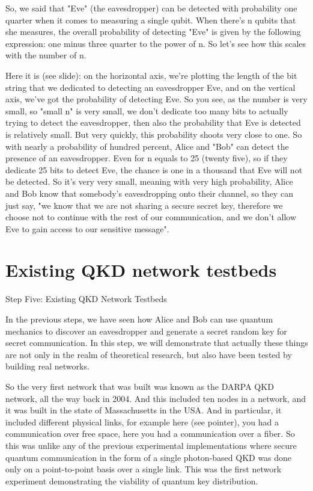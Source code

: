 So, we said that "Eve" (the eavesdropper) can be detected with probability one quarter when it comes to measuring a single qubit. When there's n qubits that she measures, the overall probability of detecting "Eve" is given by the following expression: one minus three quarter to the power of n. So let's see how this scales with the number of n.

Here it is (see slide): on the horizontal axis, we're plotting the length of the bit string that we dedicated to detecting an eavesdropper Eve, and on the vertical axis, we've got the probability of detecting Eve. So you see, as the number is very small, so "small n" is very small, we don't dedicate too many bits to actually trying to detect the eavesdropper, then also the probability that Eve is detected is relatively small. But very quickly, this probability shoots very close to one. So with nearly a probability of hundred percent, Alice and "Bob" can detect the presence of an eavesdropper. Even for n equals to 25 (twenty five), so if they dedicate 25 bits to detect Eve, the chance is one in a thousand that Eve will not be detected. So it's very very small, meaning with very high probability, Alice and Bob know that somebody's eavesdropping onto their channel, so they can just say, "we know that we are not sharing a secure secret key, therefore we choose not to continue with the rest of our communication, and we don't allow Eve to gain access to our sensitive message".



\section{Existing QKD network testbeds}

Step Five: Existing QKD Network Testbeds

In the previous steps, we have seen how Alice and Bob can use quantum mechanics to discover an eavesdropper and generate a secret random key for secret communication. In this step, we will demonstrate that actually these things are not only in the realm of theoretical research, but also have been tested by building real networks.

So the very first network that was built was known as the DARPA QKD network, all the way back in 2004. And this included ten nodes in a network, and it was built in the state of Massachusetts in the USA. And in particular, it included different physical links, for example here (see pointer), you had a communication over free space, here you had a communication over a fiber. So this was unlike any of the previous experimental implementations where secure quantum communication in the form of a single photon-based QKD was done only on a point-to-point basis over a single link. This was the first network experiment demonstrating the viability of quantum key distribution.


